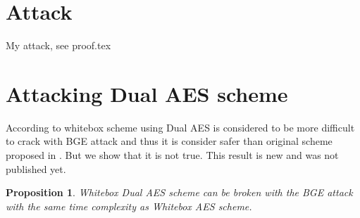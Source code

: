 \documentclass[11pt,oneside,final]{fithesis2}
\newtheorem{myprop}{Proposition}
\begin{document}
    \section{Attack}
    My attack, see proof.tex

    \section{Attacking Dual AES scheme}\label{sec:attacking_dual_aes}
	According to \citep{Karroumi:2010:PWA:2041036.2041060} whitebox scheme using Dual AES is considered to be more difficult to crack with BGE attack and thus it is consider
	safer than original scheme proposed in \citep{Chow02white-boxcryptography}. But we show that it is not true. This result is new and was not published yet.
	
	\begin{myprop}
	Whitebox Dual AES scheme can be broken with the BGE attack with the same time complexity as Whitebox AES scheme.
	\end{myprop}
\end{document}
